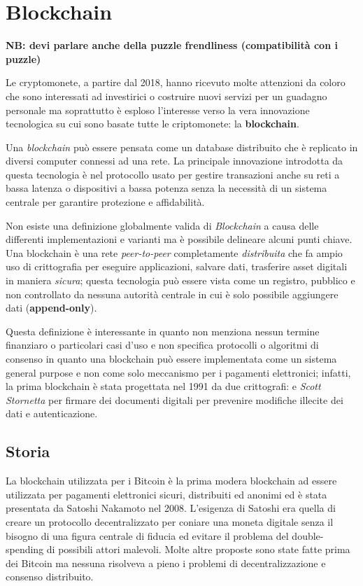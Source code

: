 \chapter{Blockchain}

\textbf{NB: devi parlare anche della puzzle frendliness (compatibilità con i puzzle)}

Le cryptomonete, a partire dal 2018, hanno ricevuto molte attenzioni da coloro che sono interessati ad investirici o costruire nuovi servizi per un guadagno personale ma soprattutto è esploso l'interesse verso la vera innovazione tecnologica su cui sono basate tutte le criptomonete: la \textbf{blockchain}.

Una \textit{blockchain} può essere pensata come un database distribuito che è replicato in diversi computer connessi ad una rete.\newline
La principale innovazione introdotta da questa tecnologia è nel protocollo usato per gestire transazioni anche su reti a bassa latenza o dispositivi a bassa potenza senza la necessità di un sistema centrale per garantire protezione e affidabilità.

Non esiste una definizione globalmente valida di \textit{Blockchain} a causa delle differenti implementazioni e varianti ma è possibile delineare alcuni punti chiave.
Una blockchain è una rete \textit{peer-to-peer} completamente \textit{distribuita} che fa ampio uso di crittografia per eseguire applicazioni, salvare dati, trasferire asset digitali in maniera \textit{sicura}; questa tecnologia può essere vista come un registro, pubblico e non controllato da nessuna autorità centrale in cui è solo possibile aggiungere dati (\textbf{append-only}).

Questa definizione è interessante in quanto non menziona nessun termine finanziaro o particolari casi d'uso e non specifica protocolli o algoritmi di consenso in quanto una blockchain può essere implementata come un sistema general purpose e non come solo meccanismo per i pagamenti elettronici; infatti, la prima blockchain è stata progettata nel 1991 da due crittografi:  e \textit{Scott Stornetta} per firmare dei documenti digitali per prevenire modifiche illecite dei dati e autenticazione.

\section{Storia}

La blockchain utilizzata per i Bitcoin è la prima modera blockchain ad essere utilizzata per pagamenti elettronici sicuri, distribuiti ed anonimi ed è stata presentata da Satoshi Nakamoto nel 2008. L'esigenza di Satoshi era quella di creare un protocollo decentralizzato per coniare una moneta digitale senza il bisogno di una figura centrale di fiducia ed evitare il problema del double-spending di possibili attori malevoli.
Molte altre proposte sono state fatte prima dei Bitcoin ma nessuna risolveva a pieno i problemi di decentralizzazione e consenso distribuito.

